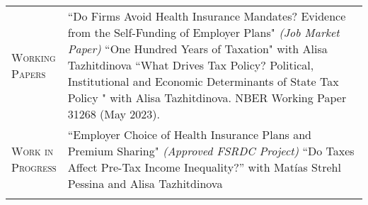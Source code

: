 \documentclass[11pt]{article}
\newcommand{\xspace}{23pt}
\begin{document}
\begin{tabularx}{\textwidth}{@{}Y Z@{}}
	\textsc{Working \newline Papers} & 
	``Do Firms Avoid Health Insurance Mandates? Evidence from the Self-Funding \newline of Employer Plans"  \textit{(Job Market Paper)}
	\vspace{10pt} \newline
	``One Hundred Years of Taxation" with Alisa Tazhitdinova
	\vspace{10pt} \newline
	``What Drives Tax Policy? Political, Institutional and Economic Determinants of \newline State Tax Policy " with Alisa Tazhitdinova. NBER Working Paper 31268 (May 2023).
     \\ \addlinespace[\xspace] 
    
    \textsc{Work in \newline Progress}  & 
    ``Employer Choice of Health Insurance Plans and Premium Sharing"
    \newline \textit{(Approved FSRDC Project)}
    \vspace{10pt} \newline
    “Do Taxes Affect Pre-Tax Income Inequality?” with Matías Strehl Pessina and \newline Alisa Tazhitdinova
     \\ \addlinespace[\xspace] 


\end{tabularx}
\end{document}
